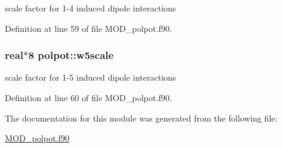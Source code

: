 scale factor for 1-\/4 induced dipole interactions 



Definition at line 59 of file M\-O\-D\-\_\-polpot.\-f90.

\hypertarget{classpolpot_ad036ebb7c31962e9aae5014aac94e41c}{
\subsubsection[{w5scale}]{\setlength{\rightskip}{0pt plus 5cm}real$\ast$8 polpot\-::w5scale}}\label{classpolpot_ad036ebb7c31962e9aae5014aac94e41c}


scale factor for 1-\/5 induced dipole interactions 



Definition at line 60 of file M\-O\-D\-\_\-polpot.\-f90.



The documentation for this module was generated from the following file\-:\begin{DoxyCompactItemize}
\item 
\hyperlink{MOD__polpot_8f90}{M\-O\-D\-\_\-polpot.\-f90}\end{DoxyCompactItemize}
